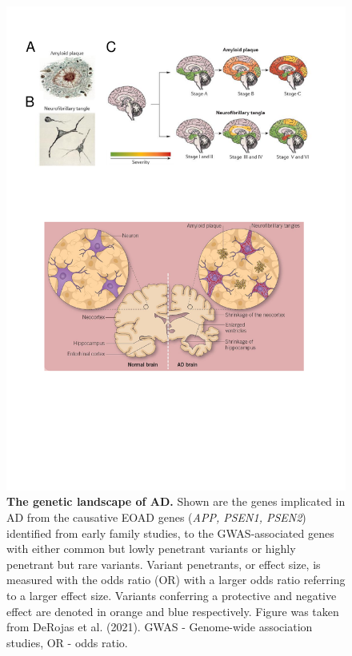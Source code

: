\begin{landscape}
	\begin{figure}[!htp]
		\centering
		\includegraphics[page=11,trim={0 17cm 0cm 1cm},clip, scale = 1.2]{Figures/Introduction_Figures.pdf}
		\captionsetup{width=1.6\textwidth,singlelinecheck=off}
		\caption[The genetic landscape of AD]%
		{\textbf{The genetic landscape of AD.} Shown are the genes implicated in AD from the causative EOAD genes (\textit{APP, PSEN1, PSEN2}) identified from early family studies, to the GWAS-associated genes with either common but lowly penetrant variants or highly penetrant but rare variants. Variant penetrants, or effect size, is measured with the odds ratio (OR) with a larger odds ratio referring to a larger effect size. Variants conferring a protective and negative effect are denoted in orange and blue respectively. Figure was taken from DeRojas et al. (2021)\cite{DeRojas2021}. GWAS - Genome-wide association studies, OR - odds ratio.
		}
		\label{fig:AD_gwas}
	\end{figure}
\end{landscape}

